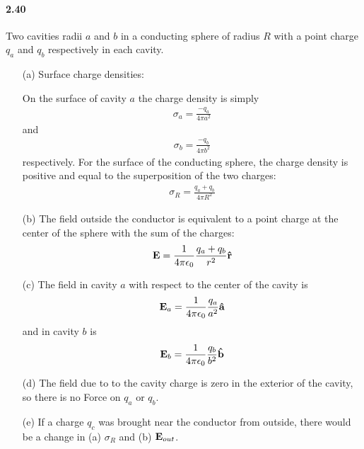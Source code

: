 \documentclass[../main.tex]{subfiles}
\begin{document}
\paragraph{2.40} Two cavities radii $a$ and $b$ in a conducting sphere of radius $R$ with a point charge $q_a$ and $q_b$ respectively in each cavity.
\begin{itemize}
    \item [(a)] Surface charge densities:
    
    On the surface of cavity $a$ the charge density is simply
    \begin{align*}
        \sigma_a = \frac{-q_a}{4\pi a^2}
    \end{align*}
    and 
    \begin{align*}
        \sigma_b = \frac{-q_b}{4\pi b^2}
    \end{align*}
    respectively. For the surface of the conducting sphere, the charge density is positive and equal to the superposition of the two charges:
    \begin{align*}
        \sigma_R = \frac{q_a + q_b}{4\pi R^2}
    \end{align*}
    \item [(b)] The field outside the conductor is equivalent to a point charge at the center of the sphere with the sum of the charges:
    \begin{align*}
        \vb E = \frac{1}{4\pi\epsilon_0} \frac{q_a + q_b}{r^2} \vu r
    \end{align*}
    \item [(c)] The field in cavity $a$ with respect to the center of the cavity is
    \begin{align*}
        \vb E_a = \frac{1}{4\pi\epsilon_0} \frac{q_a}{a^2} \vu a
    \end{align*}
    and in cavity $b$ is
    \begin{align*}
        \vb E_b = \frac{1}{4\pi\epsilon_0} \frac{q_b}{b^2} \vu b
    \end{align*}
    \item [(d)] The field due to to the cavity charge is zero in the exterior of the cavity, so there is no Force on $q_a$ or $q_b$.
    \item [(e)] If a charge $q_c$ was brought near the conductor from outside, there would be a change in (a) $\sigma_R$ and (b) $\vb E_{out}$.
\end{itemize}

\newpage
\end{document}
